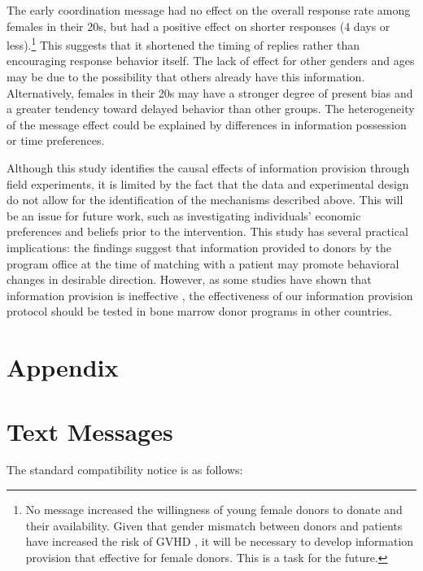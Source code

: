 \documentclass[12pt, a4paper]{article}
\begin{document}
The early coordination message had no effect on the overall response rate among females in their 20s, but had a positive effect on shorter responses (4 days or less).\footnote{No message increased the willingness of young female donors to donate and their availability. Given that gender mismatch between donors and patients have increased the risk of GVHD \citep{Loren2006, Nannya2011}, it will be necessary to develop information provision that effective for female donors. This is a task for the future.} This suggests that it shortened the timing of replies rather than encouraging response behavior itself. The lack of effect for other genders and ages may be due to the possibility that others already have this information. Alternatively, females in their 20s may have a stronger degree of present bias and a greater tendency toward delayed behavior than other groups. The heterogeneity of the message effect could be explained by differences in information possession or time preferences.

Although this study identifies the causal effects of information provision through field experiments, it is limited by the fact that the data and experimental design do not allow for the identification of the mechanisms described above. This will be an issue for future work, such as investigating individuals' economic preferences and beliefs prior to the intervention. This study has several practical implications: the findings suggest that information provided to donors by the program office at the time of matching with a patient may promote behavioral changes in desirable direction. However, as some studies have shown that information provision is ineffective \citep[for example,][]{Switzer2018}, the effectiveness of our information provision protocol should be tested in bone marrow donor programs in other countries.

\clearpage

\appendix

\hypertarget{appendix}{%
\section*{Appendix}\label{appendix}}

\hypertarget{message}{%
\section{Text Messages}\label{message}}

The standard compatibility notice is as follows:
\end{document}
